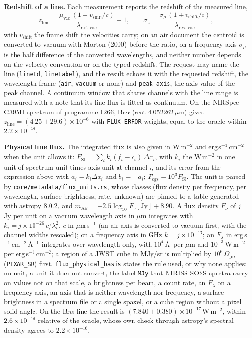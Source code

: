 \documentclass[11pt,a4paper]{article}
\newcommand{\code}[1]{\texttt{\small #1}}
\begin{document}
    \textbf{Redshift of a line.} Each measurement reports the redshift of the measured line,
    \begin{equation}
        z_{\text{line}} = \frac{\mu_{\text{vac}}\,(1 + v_{\text{shift}}/c)}{\lambda_{\text{rest,vac}}} - 1, \qquad
        \sigma_z = \frac{\sigma_\mu\,(1 + v_{\text{shift}}/c)}{\lambda_{\text{rest,vac}}},
    \end{equation}
    with $v_{\text{shift}}$ the frame shift the velocities carry; on an air document the centroid is converted to vacuum with Morton (2000) before the ratio, on a frequency axis $\sigma_\mu$ is the half difference of the converted wavelengths, and neither number depends on the velocity convention or on the typed redshift. The request may name the line (\code{lineId}, \code{lineLabel}), and the result echoes it with the requested redshift, the wavelength frame (\code{air}, \code{vacuum} or none) and \code{peak\_axis}, the axis value of the peak channel. A continuum window that shares channels with the line range is measured with a note that its line flux is fitted as continuum. On the NIRSpec G395H spectrum of programme 1266, Br$\alpha$ (rest 4.052262\,$\mu$m) gives $z_{\text{line}} = (4.25 \pm 29.6) \times 10^{-6}$ with \code{FLUX\_ERROR} weights, equal to the oracle within $2.2 \times 10^{-16}$.

    \textbf{Physical line flux.} The integrated flux is also given in W\,m$^{-2}$ and erg\,s$^{-1}$\,cm$^{-2}$ when the unit allows it: $F_{\text{SI}} = \sum_i k_i (f_i - c_i)\,\Delta x_i$, with $k_i$ the W\,m$^{-2}$ in one unit of spectrum unit times axis unit at channel $i$, and its error from the expression above with $a_i = k_i \Delta x_i$ and $b_i = -a_i$; $F_{\text{cgs}} = 10^3 F_{\text{SI}}$. The unit is parsed by \code{core/metadata/flux\_units.rs}, whose classes (flux density per frequency, per wavelength, surface brightness, rate, unknown) are pinned to a table generated with astropy 8.0.2, and $m_{\text{AB}} = -2.5 \log_{10} F_\nu[\text{Jy}] + 8.90$. A flux density $F_\nu$ of $j$ Jy per unit on a vacuum wavelength axis in $\mu$m integrates with $k_i = j \times 10^{-26}\,c / \lambda_i^2$, $c$ in $\mu$m\,s$^{-1}$ (an air axis is converted to vacuum first, with the channel widths rescaled); on a frequency axis in GHz $k = j \times 10^{-17}$; an $F_\lambda$ in erg\,s$^{-1}$\,cm$^{-2}$\,\AA$^{-1}$ integrates over wavelength only, with $10^4$\,\AA\ per $\mu$m and $10^{-3}$\,W\,m$^{-2}$ per erg\,s$^{-1}$\,cm$^{-2}$; a region of a JWST cube in MJy/sr is multiplied by $10^6\,\Omega_{\text{pix}}$ (\code{PIXAR\_SR}) first. \code{flux\_physical\_basis} states the rule used, or why none applies: no unit, a unit it does not convert, the label \code{MJy} that NIRISS SOSS spectra carry on values not on that scale, a brightness per beam, a count rate, an $F_\lambda$ on a frequency axis, an axis that is neither wavelength nor frequency, a surface brightness in a spectrum file or a single spaxel, or a cube region without a pixel solid angle. On the Br$\alpha$ line the result is $(7.840 \pm 0.380) \times 10^{-17}$\,W\,m$^{-2}$, within $2.6 \times 10^{-16}$ relative of the oracle, whose own check through astropy's spectral density agrees to $2.2 \times 10^{-16}$.
\end{document}
